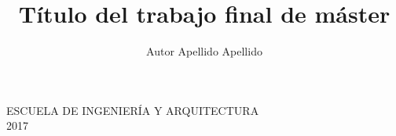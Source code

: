 \documentclass[a4paper,12pt,twoside,hidelinks,openright,openany]{report}
\begin{document}
\begin{titlepage}
\setcounter{footnote}{1}

\vspace*{16.45mm}
\fontsize{12pt}{12pt}\selectfont
\begin{center}
ESCUELA DE INGENIERÍA Y ARQUITECTURA\\
2017\\
\end{center}


\renewcommand{\thefootnote}{\arabic{footnote}}
\end{titlepage}
\newpage


\title{Título del trabajo final de máster}
\author{Autor Apellido Apellido}

\pagebreak
\cleardoublepage
\baselineskip 19pt

\renewcommand{\labelitemi}{$-$}
\renewcommand{\tablename}{Tabla}

\renewcommand{\appendixname}{Anexos}
\renewcommand{\appendixtocname}{Anexos}
\renewcommand{\appendixpagename}{Anexos}





\cleardoublepage



\newpage


\newpage

\newpage

\renewcommand{\contentsname}{Tabla de contenidos}
\tableofcontents










\end{document}
